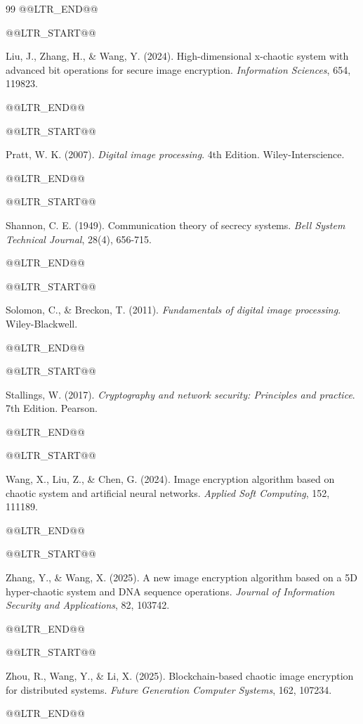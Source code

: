 \begin{thebibliography}{99}
@@LTR_END@@

@@LTR_START@@

 Liu, J., Zhang, H., \& Wang, Y. (2024). High-dimensional x-chaotic system with advanced bit operations for secure image encryption. \textit{Information Sciences}, 654, 119823.

@@LTR_END@@

@@LTR_START@@

 Pratt, W. K. (2007). \textit{Digital image processing}. 4th Edition. Wiley-Interscience.

@@LTR_END@@

@@LTR_START@@

 Shannon, C. E. (1949). Communication theory of secrecy systems. \textit{Bell System Technical Journal}, 28(4), 656-715.

@@LTR_END@@

@@LTR_START@@

 Solomon, C., \& Breckon, T. (2011). \textit{Fundamentals of digital image processing}. Wiley-Blackwell.

@@LTR_END@@

@@LTR_START@@

 Stallings, W. (2017). \textit{Cryptography and network security: Principles and practice}. 7th Edition. Pearson.

@@LTR_END@@

@@LTR_START@@

 Wang, X., Liu, Z., \& Chen, G. (2024). Image encryption algorithm based on chaotic system and artificial neural networks. \textit{Applied Soft Computing}, 152, 111189.

@@LTR_END@@

@@LTR_START@@

 Zhang, Y., \& Wang, X. (2025). A new image encryption algorithm based on a 5D hyper-chaotic system and DNA sequence operations. \textit{Journal of Information Security and Applications}, 82, 103742.

@@LTR_END@@

@@LTR_START@@

 Zhou, R., Wang, Y., \& Li, X. (2025). Blockchain-based chaotic image encryption for distributed systems. \textit{Future Generation Computer Systems}, 162, 107234.

@@LTR_END@@

\end{thebibliography}



